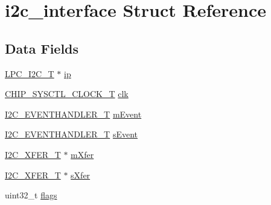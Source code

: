 \hypertarget{structi2c__interface}{\section{i2c\-\_\-interface Struct Reference}
\label{structi2c__interface}
}
\subsection*{Data Fields}
\begin{DoxyCompactItemize}
\item 
\hyperlink{structLPC__I2C__T}{L\-P\-C\-\_\-\-I2\-C\-\_\-\-T} $\ast$ \hyperlink{structi2c__interface_a3081afc519201026e2c06217a5c71eef}{ip}
\item 
\hyperlink{group__CLOCK__17XX__40XX_ga82e75cbe777e79f448fec3987ddd978e}{C\-H\-I\-P\-\_\-\-S\-Y\-S\-C\-T\-L\-\_\-\-C\-L\-O\-C\-K\-\_\-\-T} \hyperlink{structi2c__interface_a98a5ec32b8f77360ac136e09db8a9821}{clk}
\item 
\hyperlink{group__I2C__17XX__40XX_ga932bfc2f55180a71b93427e88b6223e6}{I2\-C\-\_\-\-E\-V\-E\-N\-T\-H\-A\-N\-D\-L\-E\-R\-\_\-\-T} \hyperlink{structi2c__interface_ac9762dcaee633a0121320763422eabdf}{m\-Event}
\item 
\hyperlink{group__I2C__17XX__40XX_ga932bfc2f55180a71b93427e88b6223e6}{I2\-C\-\_\-\-E\-V\-E\-N\-T\-H\-A\-N\-D\-L\-E\-R\-\_\-\-T} \hyperlink{structi2c__interface_aa0820cc1e59b1da898435b4813f5c58d}{s\-Event}
\item 
\hyperlink{structI2C__XFER__T}{I2\-C\-\_\-\-X\-F\-E\-R\-\_\-\-T} $\ast$ \hyperlink{structi2c__interface_a8894534cc883275b847f183e6fe1e7e6}{m\-Xfer}
\item 
\hyperlink{structI2C__XFER__T}{I2\-C\-\_\-\-X\-F\-E\-R\-\_\-\-T} $\ast$ \hyperlink{structi2c__interface_a891a1ea53436714c117aaa2d0917e9f2}{s\-Xfer}
\item 
uint32\-\_\-t \hyperlink{structi2c__interface_a8b1e70d8de79970bd3e61e67e59e15a2}{flags}
\end{DoxyCompactItemize}



